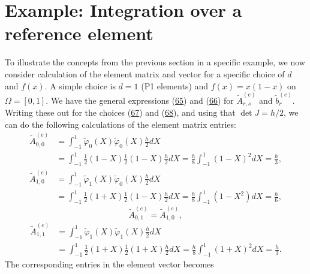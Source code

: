 \documentclass[../main.tex]{subfiles}
\begin{document}
	\section[Example: Integration over a reference element]{Example: Integration over a reference element}
	\label{sec:sec_3_9}
	\noindent To illustrate the concepts from the previous section in a specific example, we now consider calculation of the element matrix and vector for a specific choice of $d$ and $f(x)$. A simple choice is $d=1$ (P1 elements) and $f(x)=x(1-x)$ on $\Omega=[0,1]$. We have the general expressions (\hyperref[eqa65]{65}) and (\hyperref[eqa66]{66}) for $\tilde{A}_{r, s}^{(e)}$ and $\tilde{b}_{r}^{(e)}$. Writing these out for the choices (\hyperref[eqa67]{67}) and (\hyperref[eqa68]{68}), and using that $\operatorname{det} J=h / 2$, we can do the following calculations of the element matrix entries:
	\begin{equation}\label{eqa73}
		\begin{aligned}
			\tilde{A}_{0,0}^{(e)} &=\int_{-1}^{1} \tilde{\varphi}_{0}(X) \tilde{\varphi}_{0}(X) \frac{h}{2} d X \\
			&=\int_{-1}^{1} \frac{1}{2}(1-X) \frac{1}{2}(1-X) \frac{h}{2} d X=\frac{h}{8} \int_{-1}^{1}(1-X)^{2} d X=\frac{h}{3},
		\end{aligned}
	\end{equation}
	\begin{equation}\label{eqa74}
		\begin{aligned}
			\tilde{A}_{1,0}^{(e)} &=\int_{-1}^{1} \tilde{\varphi}_{1}(X) \tilde{\varphi}_{0}(X) \frac{h}{2} d X \\
			&=\int_{-1}^{1} \frac{1}{2}(1+X) \frac{1}{2}(1-X) \frac{h}{2} d X=\frac{h}{8} \int_{-1}^{1}\left(1-X^{2}\right) d X=\frac{h}{6},
		\end{aligned}
	\end{equation}
	\begin{equation}\label{eqa75}
		\tilde{A}_{0,1}^{(e)} =\tilde{A}_{1,0}^{(e)},
	\end{equation}
	\begin{equation}\label{eqa76}
		\begin{aligned}
			\tilde{A}_{1,1}^{(e)} &=\int_{-1}^{1} \tilde{\varphi}_{1}(X) \tilde{\varphi}_{1}(X) \frac{h}{2} d X \\
			&=\int_{-1}^{1} \frac{1}{2}(1+X) \frac{1}{2}(1+X) \frac{h}{2} d X=\frac{h}{8} \int_{-1}^{1}(1+X)^{2} d X=\frac{h}{3}.
		\end{aligned}
	\end{equation}
	The corresponding entries in the element vector becomes
\end{document}

